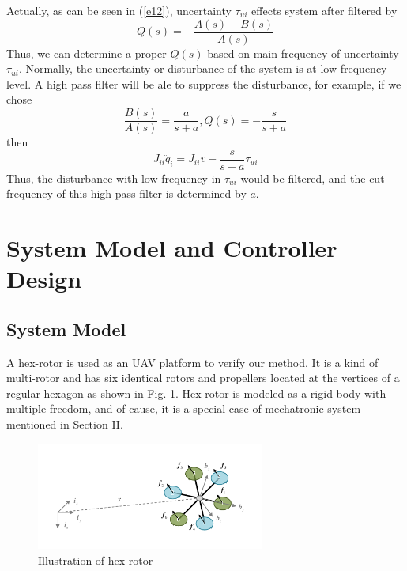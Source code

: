 \documentclass[letterpaper, 10 pt, conference]{ieeeconf}  %
\begin{document}
Actually, as can be seen in (\ref{e12}), uncertainty $\tau_{ui}$ effects system after filtered by
\begin{equation}
    Q(s) = -\frac{A(s)-B(s)}{A(s)} \label{e13}
\end{equation}
Thus, we can determine a proper $Q(s)$ based on main frequency of uncertainty $\tau_{ui}$.
Normally, the uncertainty or disturbance of the system is at low frequency level.
A high pass filter will be ale to suppress the disturbance, for example, if we chose
\begin{equation}
    \frac{B(s)}{A(s)} = \frac{a}{s+a}, Q(s) = -\frac{s}{s+a} \label{e14}
\end{equation}
then
\begin{equation}
    J_{ii}\ddot{q}_i = J_{ii}v - \frac{s}{s+a}\tau_{ui} \label{e15}
\end{equation}
Thus, the disturbance with low frequency in $\tau_{ui}$ would be filtered, and the cut frequency of this high pass filter is determined by $a$.

\section{System Model and Controller Design}

\subsection{System Model}

A hex-rotor is used as an UAV platform to verify our method.
It is a kind of multi-rotor and has six identical rotors and propellers located at the vertices of a regular hexagon as shown in Fig. \ref{f5}.
Hex-rotor is modeled as a rigid body with multiple freedom, and of cause, it is a special case of mechatronic system mentioned in Section II.
\begin{figure}[t]
    \centering
    \includegraphics[width=2.95in]{illustrations/fig5.pdf}
    \caption{Illustration of hex-rotor}
    \label{f5}
\end{figure}
\end{document}
